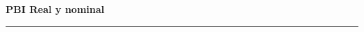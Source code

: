 \documentclass{beamer}
\begin{document}



\begin{frame}{}
\centering\huge\textbf{PBI Real y nominal} 
\vspace{2mm}
\hrule
\end{frame}
\end{document}
